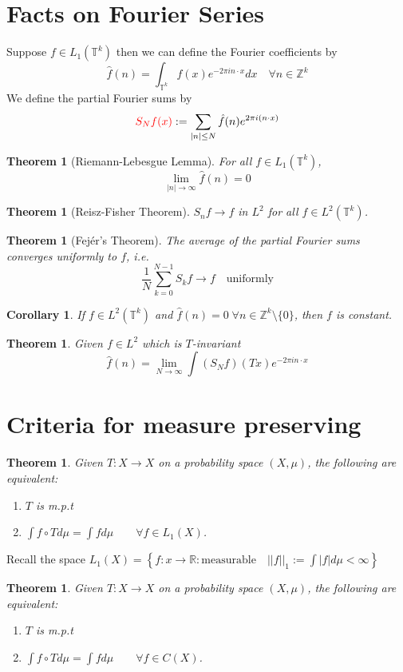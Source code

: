 \documentclass[11pt]{article}
\newcommand{\defeq}{:=}
\newcommand{\abs}[1]{\left|#1\right|}
\newcommand{\norm}[1]{\left|\left|#1\right|\right|}
\newcommand{\ktor}{\mathbb{T}^k}
\newcommand{\R}{\mathbb{R}}
\newcommand{\Z}{\mathbb{Z}}
\newcommand{\mdf}[1]{{\color{red} #1}}
\newtheorem{theorem}[prop]{Theorem}
\newtheorem{cor}[prop]{Corollary}
\begin{document}
\section{Facts on Fourier Series}
Suppose $f\in L_1(\ktor)$ then we can define the \mdf{Fourier coefficients} by
$$\hat{f}(n)=\int_{\ktor}f(x)e^{-2\pi in\cdot x}dx\quad\forall n\in\Z^k$$
We define the \mdf{partial Fourier sums} by
\[
	\mdf{S_Nf(x)}\defeq\sum_{\abs{n}\leq N}\hat{f}(n)e^{2\pi i (n\cdot x)}
\]

\begin{theorem}[Riemann-Lebesgue Lemma]
	For all $f\in L_1(\ktor)$, $$\lim_{\abs{n}\to\infty}\hat{f}(n)=0$$
\end{theorem}
\begin{theorem}[Reisz-Fisher Theorem]
$S_nf\to f$ in $L^2$ for all $f\in L^2(\ktor)$.
\end{theorem}
\begin{theorem}[Fej\'er's Theorem]
The average of the partial Fourier sums converges uniformly to $f$, i.e.
$$\frac{1}{N}\sum_{k=0}^{N-1}S_kf\to f\quad\text{uniformly}$$
\end{theorem}
\begin{cor}
If $f\in L^2(\ktor)$ and $\hat{f}(n)=0\;\forall n\in\Z^k\setminus\{0\}$, then $f$ is constant.
\end{cor}
\begin{theorem}
Given $f\in L^2$ which is $T$-invariant
$$\hat{f}(n)=\lim_{N\to\infty}\int (S_N f)(Tx)e^{-2\pi i n\cdot x}$$
\end{theorem}
\section{Criteria for measure preserving}
\begin{theorem}
Given $T:X\to X$ on a probability space $(X,\mu)$, the following are equivalent:
\begin{enumerate}
	\item $T$ is m.p.t
	\item $\int f\circ T d\mu = \int f d\mu \quad\quad \forall f\in L_1(X)$.\end{enumerate}
\end{theorem}
Recall the space $L_1(X)=\left\{ f:x\to\R : \text{measurable}\quad \norm{f}_1 \defeq\int \abs{f} d\mu < \infty \right\}$

\begin{theorem}
Given $T:X\to X$ on a probability space $(X,\mu)$, the following are equivalent:
\begin{enumerate}
	\item $T$ is m.p.t
	\item $\int f\circ T d\mu = \int f d\mu \quad\quad \forall f\in C(X)$.
\end{enumerate}
\end{theorem}
\end{document}
